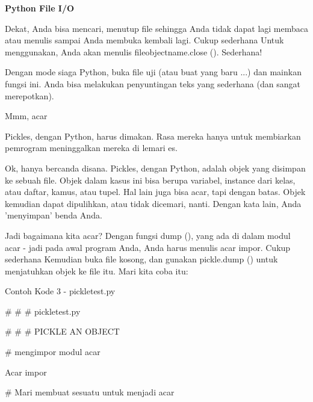 \begin{center}{\fontsize{24pt}{24pt}\selectfont \textbf{Python File I/O} \\}
\vspace{12pt}

Dekat, Anda bisa mencari, menutup file sehingga Anda tidak dapat lagi membaca atau menulis sampai Anda membuka kembali lagi. Cukup sederhana Untuk menggunakan, Anda akan menulis fileobjectname.close (). Sederhana! 

\vspace{12pt}

Dengan mode siaga Python, buka file uji (atau buat yang baru ...) dan mainkan fungsi ini. Anda bisa melakukan penyuntingan teks yang sederhana (dan sangat merepotkan). 

Mmm, acar 

\vspace{12pt}
 
Pickles, dengan Python, harus dimakan. Rasa mereka hanya untuk membiarkan pemrogram meninggalkan mereka di lemari es. 

\vspace{12pt}
 
Ok, hanya bercanda disana. Pickles, dengan Python, adalah objek yang disimpan ke sebuah file. Objek dalam kasus ini bisa berupa variabel, instance dari kelas, atau daftar, kamus, atau tupel. Hal lain juga bisa acar, tapi dengan batas. Objek kemudian dapat dipulihkan, atau tidak dicemari, nanti. Dengan kata lain, Anda 'menyimpan' benda Anda. 

\vspace{12pt}
 
Jadi bagaimana kita acar? Dengan fungsi dump (), yang ada di dalam modul acar - jadi pada awal program Anda, Anda harus menulis acar impor. Cukup sederhana Kemudian buka file kosong, dan gunakan pickle.dump () untuk menjatuhkan objek ke file itu. Mari kita coba itu: 

Contoh Kode 3 - pickletest.py

\vspace{12pt}

 $  \#  $ $  \#  $ $  \#  $ pickletest.py 
 
 $  \#  $ $  \#  $ $  \#  $ PICKLE AN OBJECT 
 
\vspace{12pt}

 $  \#  $ mengimpor modul acar 
 
Acar impor 

\vspace{12pt}
 
 $  \#  $ Mari membuat sesuatu untuk menjadi acar 
 

\end{center}
